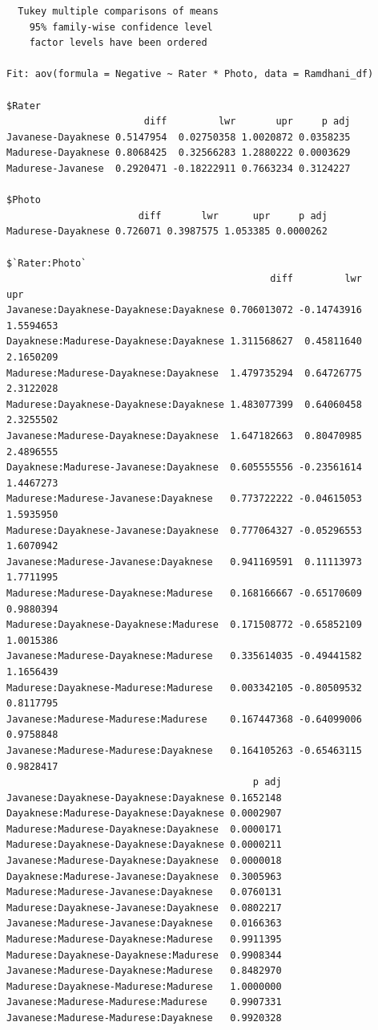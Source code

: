 \documentclass[
  11pt,
]{book}
\begin{document}
\begin{verbatim}
  Tukey multiple comparisons of means
    95% family-wise confidence level
    factor levels have been ordered

Fit: aov(formula = Negative ~ Rater * Photo, data = Ramdhani_df)

$Rater
                        diff         lwr       upr     p adj
Javanese-Dayaknese 0.5147954  0.02750358 1.0020872 0.0358235
Madurese-Dayaknese 0.8068425  0.32566283 1.2880222 0.0003629
Madurese-Javanese  0.2920471 -0.18222911 0.7663234 0.3124227

$Photo
                       diff       lwr      upr     p adj
Madurese-Dayaknese 0.726071 0.3987575 1.053385 0.0000262

$`Rater:Photo`
                                              diff         lwr       upr
Javanese:Dayaknese-Dayaknese:Dayaknese 0.706013072 -0.14743916 1.5594653
Dayaknese:Madurese-Dayaknese:Dayaknese 1.311568627  0.45811640 2.1650209
Madurese:Madurese-Dayaknese:Dayaknese  1.479735294  0.64726775 2.3122028
Madurese:Dayaknese-Dayaknese:Dayaknese 1.483077399  0.64060458 2.3255502
Javanese:Madurese-Dayaknese:Dayaknese  1.647182663  0.80470985 2.4896555
Dayaknese:Madurese-Javanese:Dayaknese  0.605555556 -0.23561614 1.4467273
Madurese:Madurese-Javanese:Dayaknese   0.773722222 -0.04615053 1.5935950
Madurese:Dayaknese-Javanese:Dayaknese  0.777064327 -0.05296553 1.6070942
Javanese:Madurese-Javanese:Dayaknese   0.941169591  0.11113973 1.7711995
Madurese:Madurese-Dayaknese:Madurese   0.168166667 -0.65170609 0.9880394
Madurese:Dayaknese-Dayaknese:Madurese  0.171508772 -0.65852109 1.0015386
Javanese:Madurese-Dayaknese:Madurese   0.335614035 -0.49441582 1.1656439
Madurese:Dayaknese-Madurese:Madurese   0.003342105 -0.80509532 0.8117795
Javanese:Madurese-Madurese:Madurese    0.167447368 -0.64099006 0.9758848
Javanese:Madurese-Madurese:Dayaknese   0.164105263 -0.65463115 0.9828417
                                           p adj
Javanese:Dayaknese-Dayaknese:Dayaknese 0.1652148
Dayaknese:Madurese-Dayaknese:Dayaknese 0.0002907
Madurese:Madurese-Dayaknese:Dayaknese  0.0000171
Madurese:Dayaknese-Dayaknese:Dayaknese 0.0000211
Javanese:Madurese-Dayaknese:Dayaknese  0.0000018
Dayaknese:Madurese-Javanese:Dayaknese  0.3005963
Madurese:Madurese-Javanese:Dayaknese   0.0760131
Madurese:Dayaknese-Javanese:Dayaknese  0.0802217
Javanese:Madurese-Javanese:Dayaknese   0.0166363
Madurese:Madurese-Dayaknese:Madurese   0.9911395
Madurese:Dayaknese-Dayaknese:Madurese  0.9908344
Javanese:Madurese-Dayaknese:Madurese   0.8482970
Madurese:Dayaknese-Madurese:Madurese   1.0000000
Javanese:Madurese-Madurese:Madurese    0.9907331
Javanese:Madurese-Madurese:Dayaknese   0.9920328
\end{verbatim}
\end{document}
